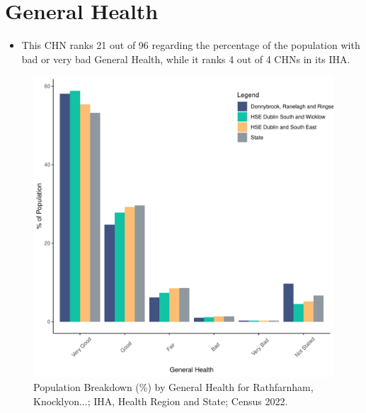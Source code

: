 \documentclass{article}
\begin{document}
\pagebreak

\section{General Health}\label{sect:GenHealth}
\begin{itemize}
\item  This CHN ranks  21 out of 96 regarding the percentage of the population with bad or very bad General Health, while it ranks   4 out of 4 CHNs in its IHA.
\end{itemize}
\begin{figure}[h]
	\centering
	\includegraphics[width = 150mm]{../figures/GenED.pdf}
	\caption{Population Breakdown (\%) by General Health for Rathfarnham, Knocklyon...; IHA, Health Region and State;  Census 2022.}
	\label{fig:2ae19629-1a6a-13a3-e055-000000000001}
	\end{figure}
\end{document}
